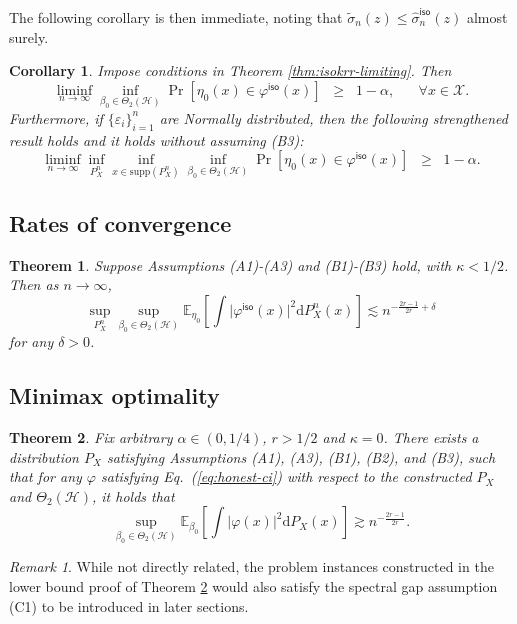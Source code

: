 \documentclass[11pt,a4paper]{article}
\renewcommand{\hat}{\widehat}
\renewcommand{\tilde}{\widetilde}
\theoremstyle{definition}
\theoremstyle{plain}
\newtheorem{theorem}{Theorem}[section]
\newtheorem{corollary}{Corollary}[section]
\theoremstyle{remark}
\newtheorem{remark}{Remark}[section]
\newcommand{\supp}{\mathrm{supp}}
\newcommand{\mX}{\mathcal X}
\newcommand{\ud}{\mathrm d}
\newcommand{\mH}{\mathcal H}
\newcommand{\iso}{\mathsf{iso}}
\begin{document}
The following corollary is then immediate, noting that $\tilde\sigma_n(z)\leq\hat\sigma_n^\iso(z)$ almost surely.
\begin{corollary}
Impose conditions in Theorem \ref{thm:isokrr-limiting}. Then
$$
\liminf_{n\to\infty}\inf_{\beta_0\in\Theta_2(\mH)}\Pr[\eta_0(x)\in\varphi^\iso(x)]\;\;\geq\;\; 1-\alpha,\;\;\;\;\;\;\forall x\in\mX.
$$
Furthermore, if $\{\varepsilon_i\}_{i=1}^n$ are Normally distributed, then the following strengthened result holds and it holds without assuming (B3):
$$
\liminf_{n\to\infty}\inf_{P_X^n}\inf_{x\in\supp(P_X^n)}\inf_{\beta_0\in\Theta_2(\mH)}\Pr[\eta_0(x)\in\varphi^\iso(x)] \;\;\geq\;\; 1-\alpha.
$$
\label{cor:isokrr-ci}
\end{corollary}

\subsection{Rates of convergence}

\begin{theorem}
Suppose Assumptions (A1)-(A3) and (B1)-(B3) hold, with $\kappa<1/2$. Then as $n\to\infty$, 
\begin{equation}
\sup_{P_X^n}\sup_{\beta_0\in\Theta_2(\mH)}\mathbb E_{\eta_0}\left[\int\big|\varphi^\iso(x)\big|^2\ud P_X^n(x)\right]\lesssim n^{-\frac{2r-1}{2r}+\delta}
\label{eq:simple-validity}
\end{equation}
for any $\delta>0$.
\label{thm:isokrr-rates}
\end{theorem}


\subsection{Minimax optimality}

\begin{theorem}
Fix arbitrary $\alpha\in(0,1/4)$, $r>1/2$ and $\kappa=0$. There exists a distribution $P_X$ satisfying Assumptions (A1), (A3), (B1), (B2), and (B3), such that for any $\varphi$ satisfying Eq.~(\ref{eq:honest-ci})
with respect to the constructed $P_X$ and $\Theta_2(\mH)$, it holds that
$$
\sup_{\beta_0\in\Theta_2(\mH)} \mathbb E_{\beta_0}\left[\int\big|\varphi(x)\big|^2\ud P_X(x)\right] \gtrsim n^{-\frac{2r-1}{2r}}.
$$
\label{thm:isokrr-lb}
\end{theorem}

\begin{remark}
While not directly related, the problem instances constructed in the lower bound proof of Theorem \ref{thm:isokrr-lb} would also satisfy the spectral gap assumption (C1) to be introduced in later sections.
\end{remark}
\end{document}
